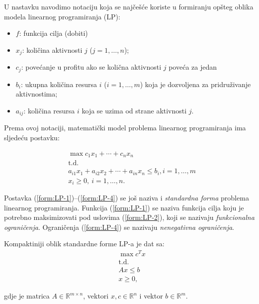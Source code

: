 \documentclass[a4paper, utf8, 11pt, colorlinks]{book}
\theoremstyle{definition}
\begin{document}
U nastavku navodimo notaciju koja se najčešće koriste u formiranju opšteg oblika modela linearnog programiranja (LP):

\begin{itemize}
    \item $f$: funkcija cilja (dobiti) 
    \item $x_j$: količina aktivnosti $j$ ($j = 1,\ldots,n$);
    \item $c_j$: povećanje u profitu ako se količna aktivnosti $j$ poveća za jedan %
    \item $b_i$: ukupna količina resursa $i$ ($i=1,\ldots,m$) koja je dozvoljena za pridruživanje aktivnostima;
    \item $a_{ij}$: količina resursa $i$ koja se uzima od strane aktivnosti $j$.
\end{itemize}
Prema ovoj notaciji, matematički model problema linearnog programiranja ima sljedeću postavku:
  
\begin{align} 
      &\max  c_1 x_1 + \cdots + c_n x_n  \label{form:LP-1}\\
      & \mbox{t.d.} \nonumber \\
      & a_{i1}x_1 + a_{i2} x_{2} + \cdots + a_{in}x_n \leq b_i, i=1,\ldots,m \label{form:LP-2} \\
      & x_i \geq 0,\ i=1,\ldots,n.\label{form:LP-4}
\end{align}

Postavka (\ref{form:LP-1})--(\ref{form:LP-4}) se još naziva i \emph{standardna forma} problema linearnog programiranja. Funkcija (\ref{form:LP-1}) se naziva funkcija cilja koju je potrebno maksimizovati pod uslovima (\ref{form:LP-2}), koji se nazivaju \emph{funkcionalna ograničenja}. Ograničenja (\ref{form:LP-4}) se nazivaju \emph{nenegativna ograničenja}. 

Kompaktiniji oblik standardne forme LP-a je dat sa:
\begin{align}
    & \max c^T x  \label{eq:LP-o1}\\
    & \mbox{t.d.} \nonumber \\
    &  A x \leq b \label{eq:LP-c1} \\
    & x \geq 0 \label{eq:LP-c2},
\end{align}

gdje je matrica $A \in \mathbb{R}^{m \times n}$, vektori  $x,c \in \mathbb{R}^n$ i vektor $b \in \mathbb{R}^{m}$.
\end{document}
